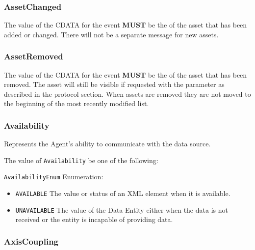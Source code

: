 \subsubsection{AssetChanged}
\label{sec:AssetChanged}



The value of the \gls{CDATA} for the event \textbf{MUST} be the  of the asset that has been added or changed. There will not be a separate message for new assets.


\subsubsection{AssetRemoved}
\label{sec:AssetRemoved}



The value of the \gls{CDATA} for the event \textbf{MUST} be the  of the asset that has been removed. The asset will still be visible if requested with the  parameter as described in the protocol section. When assets are removed they are not moved to the beginning of the most recently modified list.


\subsubsection{Availability}
\label{sec:Availability}



Represents the \gls{Agent}'s ability to communicate with the data source.


The value of \texttt{Availability} \MUST be one of the following: 


\texttt{AvailabilityEnum} Enumeration:

\begin{itemize}
\item \texttt{AVAILABLE} \newline The value or status of an XML element when it is available. 
\item \texttt{UNAVAILABLE} \newline The value of the \gls{Data Entity} either when the data is not received or the entity is incapable of providing data. 
\end{itemize}

\FloatBarrier

\subsubsection{AxisCoupling}
\label{sec:AxisCoupling}



